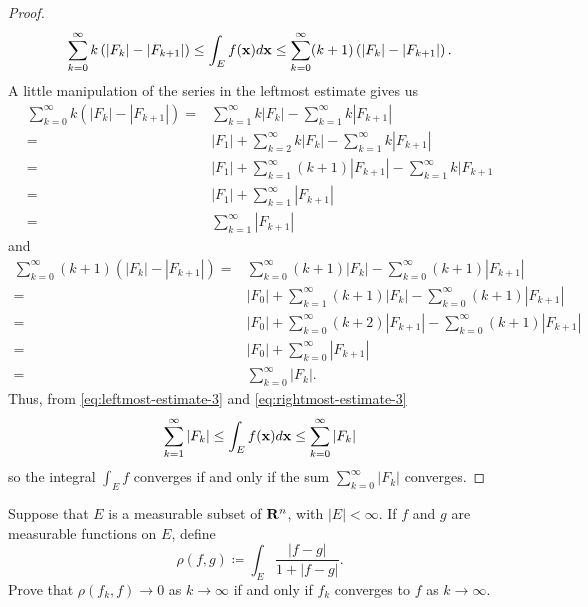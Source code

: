 \begin{proof}
\begin{equation}
\sum_{k=0}^\infty k\left(|F_k|-|F_{k+1}|\right)\leq
\int_E f(\mathbf{x}) d \mathbf{x}\leq
\sum_{k=0}^\infty (k+1)\left(|F_k|-|F_{k+1}|\right).
\end{equation}
A little manipulation of the series in the leftmost estimate gives us
\begin{equation}
\label{eq:leftmost-estimate-3}
\begin{aligned}
\sum_{k=0}^\infty k\left(|F_k|-|F_{k+1}|\right)
={}&\sum_{k=1}^\infty k|F_k|-\sum_{k=1}^\infty k|F_{k+1}|\\
={}&|F_1|+\sum_{k=2}^\infty k|F_k|-\sum_{k=1}^\infty k|F_{k+1}|\\
={}&|F_1|+\sum_{k=1}^\infty(k+1)|F_{k+1}|-\sum_{k=1}^\infty k|F_{k+1}\\
={}&|F_1|+\sum_{k=1}^\infty |F_{k+1}|\\
={}&\sum_{k=1}^\infty|F_{k+1}|
\end{aligned}
\end{equation}
and
\begin{equation}
\label{eq:rightmost-estimate-3}
\begin{aligned}
\sum_{k=0}^\infty(k+1)\left(|F_k|-|F_{k+1}|\right)
={}&\sum_{k=0}^\infty(k+1)|F_k|-\sum_{k=0}^\infty(k+1)|F_{k+1}|\\
={}&|F_0|+\sum_{k=1}^\infty(k+1)|F_k|-\sum_{k=0}^\infty(k+1)|F_{k+1}|\\
={}&|F_0|+\sum_{k=0}^\infty(k+2)|F_{k+1}|-\sum_{k=0}^\infty(k+1)|F_{k+1}|\\
={}&|F_0|+\sum_{k=0}^\infty|F_{k+1}|\\
={}&\sum_{k=0}^\infty|F_k|.
\end{aligned}
\end{equation}
Thus, from \eqref{eq:leftmost-estimate-3} and
\eqref{eq:rightmost-estimate-3}
\begin{equation}
\label{eq:final-upper-lower-estimates-3}
\sum_{k=1}^\infty|F_k|\leq\int_E f(\mathbf{x}) d \mathbf{x}\leq\sum_{k=0}^\infty|F_k|
\end{equation}
so the integral $\int_E f$ converges if and only if the sum
$\sum_{k=0}^\infty|F_k|$ converges.
\end{proof}
\begin{problem}
Suppose that $E$ is a measurable subset of $\mathbf{R}^n$, with
$|E|<\infty$. If $f$ and $g$ are measurable functions on
$E$, define
\[
\rho(f,g)\coloneqq\int_E\frac{|f-g|}{1+|f-g|}.
\]
Prove that $\rho(f_k,f)\to 0$ as $k\to\infty$ if and only if $f_k$
converges to $f$ as $k\to\infty$.
\end{problem}
